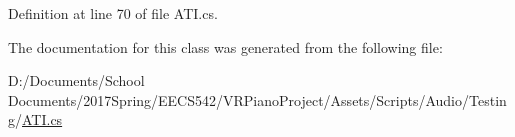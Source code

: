 Definition at line 70 of file A\+T\+I.\+cs.



The documentation for this class was generated from the following file\+:\begin{DoxyCompactItemize}
\item 
D\+:/\+Documents/\+School Documents/2017\+Spring/\+E\+E\+C\+S542/\+V\+R\+Piano\+Project/\+Assets/\+Scripts/\+Audio/\+Testing/\hyperlink{_a_t_i_8cs}{A\+T\+I.\+cs}\end{DoxyCompactItemize}
